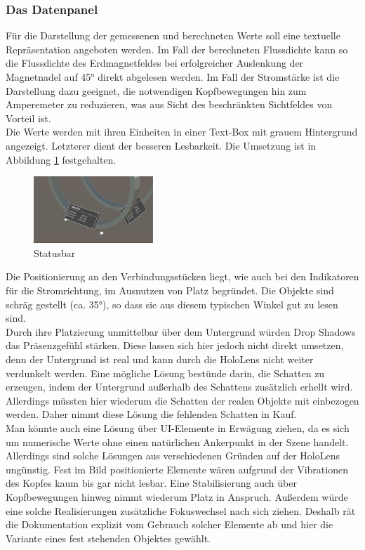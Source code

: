 \subsubsection{Das Datenpanel}
\label{sec-4-2-5}
Für die Darstellung der gemessenen und berechneten Werte soll eine textuelle Repräsentation angeboten werden. Im Fall der berechneten Flussdichte kann so die Flussdichte des Erdmagnetfeldes bei erfolgreicher Auslenkung der Magnetnadel auf 45° direkt abgelesen werden. Im Fall der Stromstärke ist die Darstellung dazu geeignet, die notwendigen Kopfbewegungen hin zum Amperemeter zu reduzieren, was aus Sicht des beschränkten Sichtfeldes von Vorteil ist.\\
\noindent\hspace*{5mm}
Die Werte werden mit ihren Einheiten in einer Text-Box mit grauem Hintergrund angezeigt. Letzterer dient der besseren Lesbarkeit. Die Umsetzung ist in Abbildung \ref{img:status} festgehalten.

\begin{figure}[h!]
\centering
\includegraphics[width=0.4\textwidth]{images/unity/status.jpg}
\caption{Statusbar}
\label{img:status}
\end{figure}
Die Positionierung an den Verbindungsstücken liegt, wie auch bei den Indikatoren für die Stromrichtung, im Ausnutzen von Platz begründet. Die Objekte sind schräg gestellt (ca. 35°), so dass sie aus diesem typischen Winkel gut zu lesen sind.\\

Durch ihre Platzierung unmittelbar über dem Untergrund würden Drop Shadows das Präsenzgefühl stärken. Diese lassen sich hier jedoch nicht direkt umsetzen, denn der Untergrund ist real und kann durch die HoloLens nicht weiter verdunkelt werden. Eine mögliche Lösung bestünde darin, die Schatten zu erzeugen, indem der Untergrund außerhalb des Schattens zusätzlich erhellt wird. Allerdings müssten hier wiederum die Schatten der realen Objekte mit einbezogen werden. Daher nimmt diese Lösung die fehlenden Schatten in Kauf.\\

Man könnte auch eine Lösung über UI-Elemente in Erwägung ziehen, da es sich um numerische Werte ohne einen natürlichen Ankerpunkt in der Szene handelt. Allerdings sind solche Lösungen aus verschiedenen Gründen auf der HoloLens ungünstig. Fest im Bild positionierte Elemente wären aufgrund der Vibrationen des Kopfes kaum bis gar nicht lesbar. Eine Stabilisierung auch über Kopfbewegungen hinweg nimmt wiederum Platz in Anspruch. Außerdem würde eine solche Realisierungen zusätzliche Fokuswechsel nach sich ziehen. Deshalb rät die Dokumentation explizit vom Gebrauch solcher Elemente ab und hier die Variante eines fest stehenden Objektes gewählt.\\

